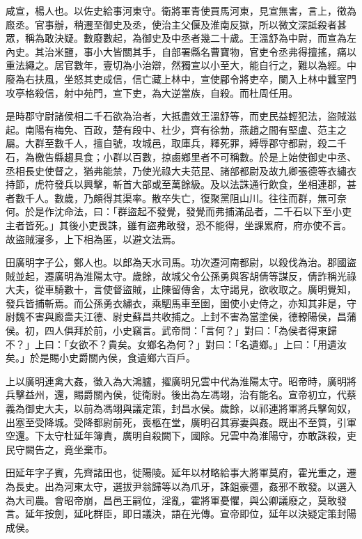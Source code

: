 \begin{pinyinscope}
咸宣，楊人也。以佐史給事河東守。衛將軍青使買馬河東，見宣無害，言上，徵為廄丞。官事辦，稍遷至御史及丞，使治主父偃及淮南反獄，所以微文深詆殺者甚眾，稱為敢決疑。數廢數起，為御史及中丞者幾二十歲。王溫舒為中尉，而宣為左內史。其治米鹽，事小大皆關其手，自部署縣名曹寶物，官吏令丞弗得擅搖，痛以重法繩之。居官數年，壹切為小治辯，然獨宣以小至大，能自行之，難以為經。中廢為右扶風，坐怒其吏成信，信亡藏上林中，宣使郿令將吏卒，闌入上林中蠶室門攻亭格殺信，射中苑門，宣下吏，為大逆當族，自殺。而杜周任用。

是時郡守尉諸侯相二千石欲為治者，大抵盡效王溫舒等，而吏民益輕犯法，盜賊滋起。南陽有梅免、百政，楚有段中、杜少，齊有徐勃，燕趙之間有堅盧、范主之屬。大群至數千人，擅自號，攻城邑，取庫兵，釋死罪，縛辱郡守都尉，殺二千石，為檄告縣趨具食；小群以百數，掠鹵鄉里者不可稱數。於是上始使御史中丞、丞相長史使督之，猶弗能禁，乃使光祿大夫范昆、諸部都尉及故九卿張德等衣繡衣持節，虎符發兵以興擊，斬首大部或至萬餘級。及以法誅通行飲食，坐相連郡，甚者數千人。數歲，乃頗得其渠率。散卒失亡，復聚黨阻山川。往往而群，無可奈何。於是作沈命法，曰：「群盜起不發覺，發覺而弗捕滿品者，二千石以下至小吏主者皆死。」其後小吏畏誅，雖有盜弗敢發，恐不能得，坐課累府，府亦使不言。故盜賊寖多，上下相為匿，以避文法焉。

田廣明字子公，鄭人也。以郎為天水司馬。功次遷河南都尉，以殺伐為治。郡國盜賊並起，遷廣明為淮陽太守。歲餘，故城父令公孫勇與客胡倩等謀反，倩詐稱光祿大夫，從車騎數十，言使督盜賊，止陳留傳舍，太守謁見，欲收取之。廣明覺知，發兵皆捕斬焉。而公孫勇衣繡衣，乘駟馬車至圉，圉使小史侍之，亦知其非是，守尉魏不害與廄嗇夫江德、尉史蘇昌共收捕之。上封不害為當塗侯，德轑陽侯，昌蒲侯。初，四人俱拜於前，小史竊言。武帝問：「言何？」對曰：「為侯者得東歸不？」上曰：「女欲不？貴矣。女鄉名為何？」對曰：「名遺鄉。」上曰：「用遺汝矣。」於是賜小史爵關內侯，食遺鄉六百戶。

上以廣明連禽大姦，徵入為大鴻臚，擢廣明兄雲中代為淮陽太守。昭帝時，廣明將兵擊益州，還，賜爵關內侯，徙衛尉。後出為左馮翊，治有能名。宣帝初立，代蔡義為御史大夫，以前為馮翊與議定策，封昌水侯。歲餘，以祁連將軍將兵擊匈奴，出塞至受降城。受降都尉前死，喪柩在堂，廣明召其寡妻與姦。既出不至質，引軍空還。下太守杜延年簿責，廣明自殺闕下，國除。兄雲中為淮陽守，亦敢誅殺，吏民守闕告之，竟坐棄市。

田延年字子賓，先齊諸田也，徙陽陵。延年以材略給事大將軍莫府，霍光重之，遷為長史。出為河東太守，選拔尹翁歸等以為爪牙，誅鉏豪彊，姦邪不敢發。以選入為大司農。會昭帝崩，昌邑王嗣位，淫亂，霍將軍憂懼，與公卿議廢之，莫敢發言。延年按劍，延叱群臣，即日議決，語在光傳。宣帝即位，延年以決疑定策封陽成侯。


\end{pinyinscope}
